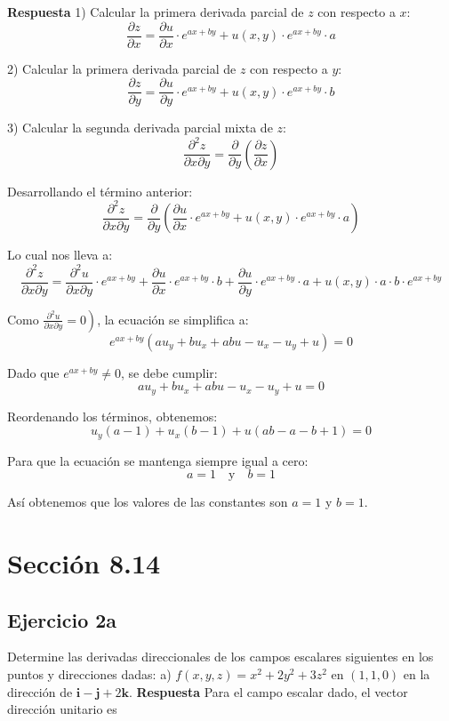 \documentclass{report}
\begin{document}
    \textbf{Respuesta}
    1) Calcular la primera derivada parcial de $z$ con respecto a $x$:
    $$
    \frac{\partial z}{\partial x} = \frac{\partial u}{\partial x} \cdot e^{a x + b y} + u(x, y) \cdot e^{a x + b y} \cdot a
    $$

    2) Calcular la primera derivada parcial de $z$ con respecto a $y$:
    $$
    \frac{\partial z}{\partial y} = \frac{\partial u}{\partial y} \cdot e^{a x + b y} + u(x, y) \cdot e^{a x + b y} \cdot b
    $$

    3) Calcular la segunda derivada parcial mixta de $z$:
    $$
    \frac{\partial^{2} z}{\partial x \partial y} = \frac{\partial}{\partial y} \left( \frac{\partial z}{\partial x} \right)
    $$

    Desarrollando el término anterior:
    $$
    \frac{\partial^{2} z}{\partial x \partial y} = \frac{\partial}{\partial y} \left( \frac{\partial u}{\partial x} \cdot e^{a x + b y} + u(x, y) \cdot e^{a x + b y} \cdot a \right)
    $$

    Lo cual nos lleva a:
    $$
    \frac{\partial^{2} z}{\partial x \partial y} = \frac{\partial^{2} u}{\partial x \partial y} \cdot e^{a x + b y} + \frac{\partial u}{\partial x} \cdot e^{a x + b y} \cdot b + \frac{\partial u}{\partial y} \cdot e^{a x + b y} \cdot a + u(x, y) \cdot a \cdot b \cdot e^{a x + b y}
    $$

    Como  $\left.\frac{\partial^{2} u}{\partial x \partial y}=0\right)$, la ecuación se simplifica a:
    $$
    e^{a x + b y} \left( a u_y + b u_x + ab u - u_x - u_y + u \right) = 0
    $$

    Dado que $e^{a x + b y} \neq 0$, se debe cumplir:
    $$
    a u_y + b u_x + ab u - u_x - u_y + u = 0
    $$

    Reordenando los términos, obtenemos:
    $$
    u_y (a - 1) + u_x (b - 1) + u (ab - a - b + 1) = 0
    $$

    Para que la ecuación se mantenga siempre igual a cero:
    $$
    a = 1 \quad \text{y} \quad b = 1
    $$

    Así obtenemos que los valores de las constantes son $a=1$ y $b=1$.
    \section*{Sección 8.14}
    \subsection*{Ejercicio 2a}
    Determine las derivadas direccionales de los campos escalares siguientes en los puntos y direcciones dadas:
    a) $f(x, y, z) = x^2 + 2y^2 + 3z^2$ en $(1,1,0)$ en la dirección de $\boldsymbol{i} - \boldsymbol{j} + 2 \boldsymbol{k}$.
    \textbf{Respuesta}
    Para el campo escalar dado, el vector dirección unitario es
\end{document}
